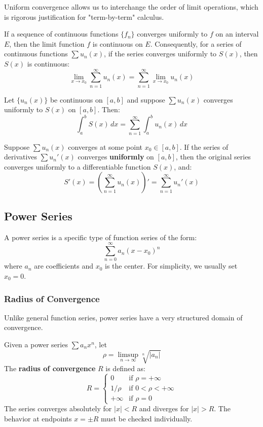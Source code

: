Uniform convergence allows us to interchange the order of limit operations, which is rigorous justification for "term-by-term" calculus.

\begin{theorem}[Continuity]
If a sequence of continuous functions $\{f_n\}$ converges uniformly to $f$ on an interval $E$, then the limit function $f$ is continuous on $E$.
Consequently, for a series of continuous functions $\sum u_n(x)$, if the series converges uniformly to $S(x)$, then $S(x)$ is continuous:
\[ \lim_{x \to x_0} \sum_{n=1}^{\infty} u_n(x) = \sum_{n=1}^{\infty} \lim_{x \to x_0} u_n(x) \]
\end{theorem}

\begin{theorem}
Let $\{u_n(x)\}$ be continuous on $[a, b]$ and suppose $\sum u_n(x)$ converges uniformly to $S(x)$ on $[a, b]$. Then:
\[ \int_a^b S(x) \, dx = \sum_{n=1}^{\infty} \int_a^b u_n(x) \, dx \]
\end{theorem}

\begin{theorem}
Suppose $\sum u_n(x)$ converges at some point $x_0 \in [a, b]$. If the series of derivatives $\sum u_n'(x)$ converges \textbf{uniformly} on $[a, b]$, then the original series converges uniformly to a differentiable function $S(x)$, and:
\[ S'(x) = \left( \sum_{n=1}^{\infty} u_n(x) \right)' = \sum_{n=1}^{\infty} u_n'(x) \]
\end{theorem}

\subsection{Power Series}

A power series is a specific type of function series of the form:
\[ \sum_{n=0}^{\infty} a_n (x - x_0)^n \]
where $a_n$ are coefficients and $x_0$ is the center. For simplicity, we usually set $x_0 = 0$.

\subsubsection{Radius of Convergence}

Unlike general function series, power series have a very structured domain of convergence.

\begin{theorem}
Given a power series $\sum a_n x^n$, let
\[ \rho = \limsup_{n \to \infty} \sqrt[n]{|a_n|} \]
The \textbf{radius of convergence} $R$ is defined as:
\[ R = \begin{cases} 0 & \text{if } \rho = +\infty \\ 1/\rho & \text{if } 0 < \rho < +\infty \\ +\infty & \text{if } \rho = 0 \end{cases} \]
The series converges absolutely for $|x| < R$ and diverges for $|x| > R$. The behavior at endpoints $x = \pm R$ must be checked individually.
\end{theorem}

